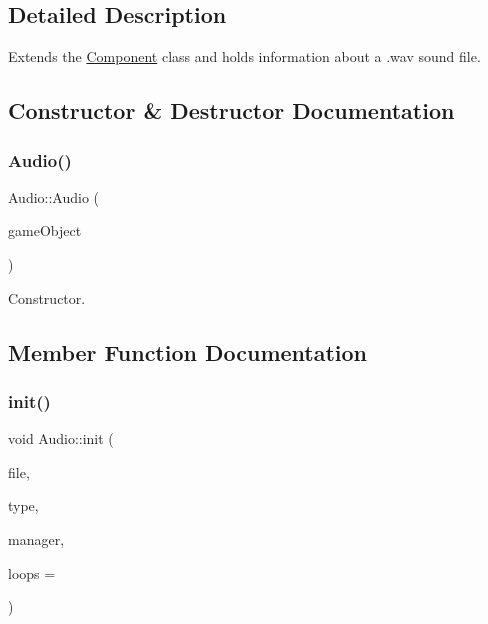 \subsection{Detailed Description}
Extends the \hyperlink{class_mason_1_1_component}{Component} class and holds information about a .wav sound file. 

\subsection{Constructor \& Destructor Documentation}
\hypertarget{class_mason_1_1_audio_aa65245dcba1c0a373b7130e7e36306c2}{}\label{class_mason_1_1_audio_aa65245dcba1c0a373b7130e7e36306c2} 
\subsubsection{\texorpdfstring{Audio()}{Audio()}}
{\footnotesize\ttfamily Audio\+::\+Audio (\begin{DoxyParamCaption}\item[{std\+::shared\+\_\+ptr$<$ \hyperlink{class_mason_1_1_game_object}{Game\+Object} $>$}]{game\+Object }\end{DoxyParamCaption})\hspace{0.3cm}{\ttfamily [protected]}}



Constructor. 



\subsection{Member Function Documentation}
\hypertarget{class_mason_1_1_audio_a5d4f318f5bee0b59d1a4289495b01b4c}{}\label{class_mason_1_1_audio_a5d4f318f5bee0b59d1a4289495b01b4c} 
\subsubsection{\texorpdfstring{init()}{init()}}
{\footnotesize\ttfamily void Audio\+::init (\begin{DoxyParamCaption}\item[{std\+::string}]{file,  }\item[{\hyperlink{namespace_mason_a158d651086d1ba1aacc4c37125b27657}{Sound\+Type}}]{type,  }\item[{\hyperlink{class_mason_1_1_audio_manager}{Audio\+Manager} $\ast$}]{manager,  }\item[{int}]{loops = {} }\end{DoxyParamCaption})}



